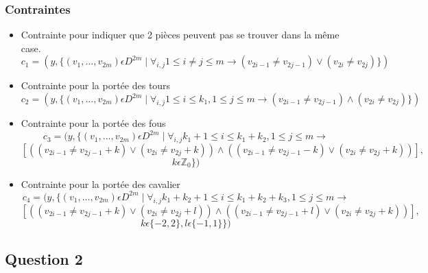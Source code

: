 \documentclass[a4paper,11pt]{article}
\begin{document}
\subsubsection{Contraintes}
\begin{itemize}
\item Contrainte pour indiquer que 2 pièces peuvent pas se trouver dans la même case.
   $$c_{1} = ( y, \{ (v_{1}, ..., v_{2m}) \epsilon  D^{2m} \mid \forall_{i,j} 1\leq i \neq j \leq m \rightarrow (v_{2i-1} \neq v_{2j-1}) \vee  (v_{2i} \neq v_{2j}) \} ) $$
\item Contrainte pour la portée des tours 
 $$ c_{2} = ( y, \{ (v_{1}, ..., v_{2m}) \epsilon  D^{2m} \mid \forall_{i,j} 1\leq i \leq k_{1}, 1\leq j \leq m  \rightarrow (v_{2i-1} \neq v_{2j-1}) \wedge  (v_{2i} \neq v_{2j}) \} ) $$

\item Contrainte pour la portée des fous 
  $$c_{3} = ( y, \{ (v_{1}, ..., v_{2m}) \epsilon  D^{2m} \mid \forall_{i,j} k_{1}+1\leq i \leq k_{1}+k_{2}, 1\leq j \leq m \rightarrow$$
  $$[ ((v_{2i-1} \neq v_{2j-1}+k) \vee  (v_{2i} \neq v_{2j}+k)) \wedge  ((v_{2i-1} \neq v_{2j-1}-k) \vee  (v_{2i} \neq v_{2j}+k)) ],$$
  $$k \epsilon \mathbb{Z}_{0} \} ) $$

\item Contrainte pour la portée des cavalier 
  $$ c_{4} = ( y, \{ (v_{1}, ..., v_{2m}) \epsilon  D^{2m} \mid \forall_{i,j} k_{1}+k_{2}+1\leq i \leq k_{1}+k_{2}+k_{3}, 1\leq j \leq m \rightarrow$$
  $$[((v_{2i-1} \neq v_{2j-1}+k) \vee  (v_{2i} \neq v_{2j}+l)) \wedge ((v_{2i-1} \neq v_{2j-1}+l) \vee  (v_{2i} \neq v_{2j}+k)) ],$$
  $$k \epsilon \{-2, 2\}, l \epsilon \{-1, 1\} \} )$$

\end{itemize}

\subsection{Question 2}
\end{document}
